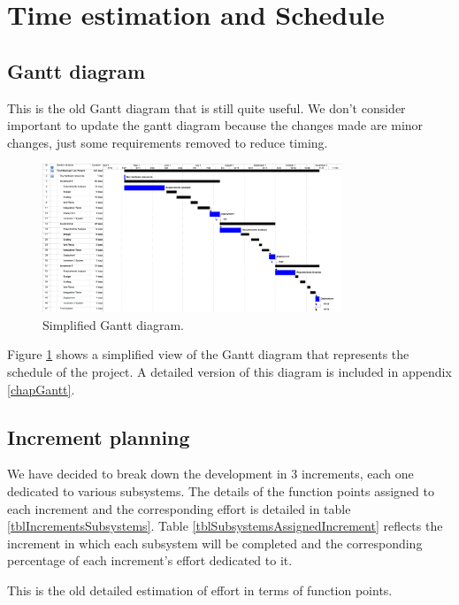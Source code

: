 \section{Time estimation and Schedule}
\label{secTimeEstimation}
\subsection{Gantt diagram}

This is the old Gantt diagram that is still quite useful. We don't consider important to update the gantt diagram because the changes made are minor changes, just some requirements removed to reduce timing.

\begin{figure}[hbtp]
\centering
\includegraphics[width=0.8\textwidth]{img/GanttDiagram.png}
\caption{Simplified Gantt diagram.}
\label{figGanttSimple}
\end{figure}

Figure \ref{figGanttSimple} shows a simplified view of the Gantt diagram that represents the schedule of the project. A detailed version of this diagram is included in appendix \ref{chapGantt}.

\subsection{Increment planning}

We have decided to break down the development in 3 increments, each one dedicated to various subsystems. The details of the function points assigned to each increment and the corresponding effort is detailed in table \ref{tblIncrementsSubsystems}. Table \ref{tblSubsystemsAssignedIncrement} reflects the increment in which each subsystem will be completed and the corresponding percentage of each increment's effort dedicated to it.

This is the old detailed estimation of effort in terms of function points.

